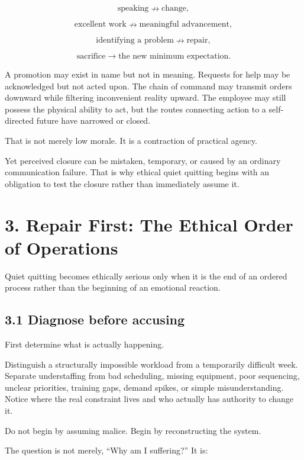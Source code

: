 \documentclass[11pt,oneside]{article}
\begin{document}
\[
\text{speaking} \nrightarrow \text{change},
\]

\[
\text{excellent work} \nrightarrow \text{meaningful advancement},
\]

\[
\text{identifying a problem} \nrightarrow \text{repair},
\]

\[
\text{sacrifice} \rightarrow \text{the new minimum expectation}.
\]

A promotion may exist in name but not in meaning. Requests for help may
be acknowledged but not acted upon. The chain of command may transmit
orders downward while filtering inconvenient reality upward. The
employee may still possess the physical ability to act, but the routes
connecting action to a self-directed future have narrowed or closed.

That is not merely low morale. It is a contraction of practical agency.

Yet perceived closure can be mistaken, temporary, or caused by an
ordinary communication failure. That is why ethical quiet quitting
begins with an obligation to test the closure rather than immediately
assume it.

\section{3. Repair First: The Ethical Order of
Operations}\label{repair-first-the-ethical-order-of-operations}

Quiet quitting becomes ethically serious only when it is the end of an
ordered process rather than the beginning of an emotional reaction.

\subsection{3.1 Diagnose before
accusing}\label{diagnose-before-accusing}

First determine what is actually happening.

Distinguish a structurally impossible workload from a temporarily
difficult week. Separate understaffing from bad scheduling, missing
equipment, poor sequencing, unclear priorities, training gaps, demand
spikes, or simple misunderstanding. Notice where the real constraint
lives and who actually has authority to change it.

Do not begin by assuming malice. Begin by reconstructing the system.

The question is not merely, ``Why am I suffering?'' It is:
\end{document}
